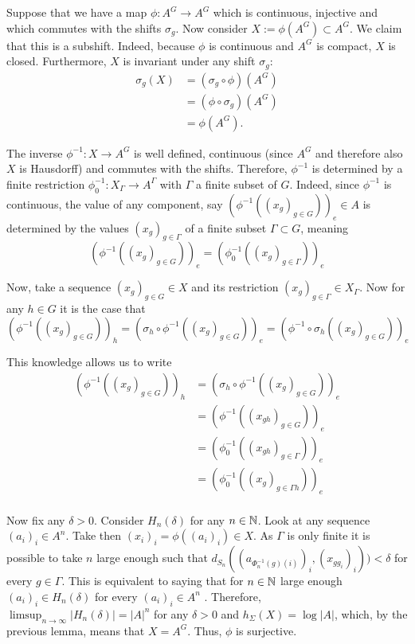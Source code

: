 Suppose that we have a map $\phi: A^G \to A^G$ which is continuous, injective and which commutes with the shifts $\sigma_g$. Now consider $X := \phi(A^G) \subset A^G$. We claim that this is a subshift. Indeed, because $\phi$ is continuous and $A^G$ is compact, $X$ is closed. Furthermore, $X$ is invariant under any shift $\sigma_g$: 
		\begin{align*}
		\sigma_g(X)
		&= (\sigma_g \circ \phi) (A^G) \\
		&= (\phi \circ \sigma_g)(A^G) \\
		&= \phi(A^G).
		\end{align*}
		
The inverse $\phi^{-1}: X \to A^G$ is well defined, continuous (since $A^G$ and therefore also $X$ is Hausdorff) and commutes with the shifts. Therefore,  $\phi^{-1}$ is determined by a finite restriction $\phi^{-1}_0: X_{\Gamma} \to A^{\Gamma}$ with $\Gamma$ a finite subset of $G$. Indeed, since $\phi^{-1}$ is continuous, the value of any component, say $(\phi^{-1}((x_g)_{g \in G}))_e \in A$ is determined by the values $(x_g)_{g \in \Gamma}$ of a finite subset $\Gamma \subset G$, meaning 
		\[
		(\phi^{-1}((x_g)_{g \in G}))_e = (\phi^{-1}_0((x_g)_{g \in \Gamma}))_e
		\]

Now, take a sequence $(x_g)_{g \in G} \in X$ and its restriction $(x_g)_{g \in \Gamma} \in X_{\Gamma}$. Now for any $h \in G$ it is the case that 
		\[
		(\phi^{-1}((x_g)_{g \in G}))_h = (\sigma_h \circ \phi^{-1}((x_g)_{g \in G}))_e  = (\phi^{-1} \circ \sigma_h((x_g)_{g \in G}))_e
		\]

This knowledge allows us to write
		\begin{align*}
		(\phi^{-1}((x_g)_{g \in G}))_h
		&= (\sigma_h \circ \phi^{-1}((x_g)_{g \in G}))_e \\
		&= (\phi^{-1}((x_{gh})_{g \in G}))_e \\
		&= (\phi^{-1}_0((x_{gh})_{g \in \Gamma}))_e \\
		&= (\phi^{-1}_0((x_g)_{g \in \Gamma h}))_e
		\end{align*}
\\
Now fix any $\delta > 0$. Consider $H_n(\delta)$ for any $n \in \mathbb{N}$. Look at any sequence $(a_i)_i \in A^n$. Take then $(x_i)_i = \phi((a_i)_i) \in X$. As $\Gamma$ is only finite it is possible to take $n$ large enough such that $d_{S_n}((a_{\Phi^{-1}_n(g)(i)})_i,(x_{g g_i})_i)) < \delta$ for every $g \in \Gamma$. This is equivalent to saying that for $n \in \mathbb{N}$ large enough $(a_i)_i \in H_n(\delta)$ for every $(a_i)_i \in A^n$ . Therefore, $\limsup_{n \to \infty} |H_n(\delta)| = |A|^{n}$ for any $\delta >0$ and $h_\Sigma(X) = \log |A|$, which, by the previous lemma, means that $X = A^G$. Thus, $\phi$ is surjective.